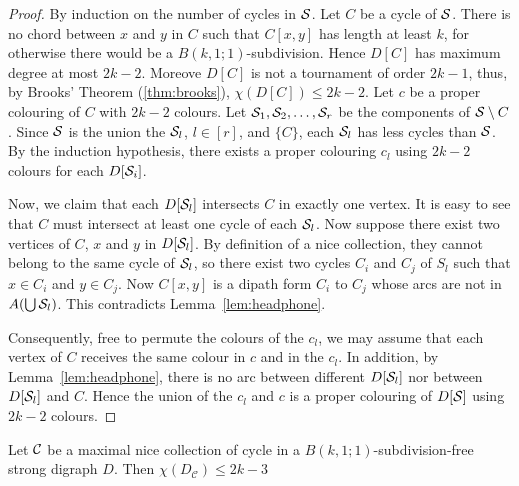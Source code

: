 \documentclass{endm}
\begin{document}
\begin{proof}
By induction on the number of cycles in ${\cal S}$. Let $C$ be a cycle of ${\cal S}$. There is no chord between $x$ and $y$ in $C$
such that $C[x,y]$ has length at least $k$, for otherwise there would be a $B(k,1;1)$-subdivision. Hence $D[C]$ has maximum degree at most $2k-2$. Moreove $D[C]$ is not a tournament of order $2k-1$,
thus, by Brooks' Theorem (\ref{thm:brooks}), $\chi(D[C])\leq 2k-2$.
 Let $c$ be a proper colouring of $C$ with $2k-2$ colours. Let ${\cal S}_1, {\cal S}_2, \dots, {\cal S}_r$ be the components of ${\cal S} \setminus{C}$. Since ${\cal S}$ is the union the ${\cal S}_l$, $l\in [r]$, and $\{C\}$,
each ${\cal S}_l$ has less cycles than ${\cal S}$. By the induction hypothesis, there exists a proper colouring $c_l$ using $2k-2$ colours for each $D[{\cal S}_i]$.
 
Now, we claim that each $D[{\cal S}_l]$ intersects $C$ in exactly one vertex. It is easy to see that $C$ must intersect at least one cycle of each ${\cal S}_l$.
Now suppose there exist two vertices of $C$, $x$ and $y$ in $D[{\cal S}_l]$. By definition of a nice collection, they cannot belong to the same cycle 
of ${\cal S}_l$, so there exist two cycles $C_i$ and $C_j$ of $S_l$ such that $x \in C_i$ and $y \in C_j$. Now $C[x,y]$ is a dipath form $C_i$ to $C_j$ whose arcs are not in $A(\bigcup {\cal S}_l)$. This contradicts Lemma~\ref{lem:headphone}. 

Consequently, free to permute the colours of the $c_l$,
we may assume that each vertex of $C$ receives the same colour in $c$ and in the $c_l$. 
In addition, by Lemma~\ref{lem:headphone}, there is no arc between different $D[{\cal S}_l]$ nor between $D[{\cal S}_l]$ and $C$. Hence the union of the 
$c_l$ and $c$ is a proper colouring of $D[{\cal S}]$ using $2k-2$ colours. 
\end{proof}


\begin{lemma}\label{lem:reduce}
Let ${\cal C}$ be a maximal nice collection of cycle in a $B(k,1;1)$-subdivision-free strong digraph $D$. Then $\chi(D_{\mathcal{C}}) \leq 2k-3$
\end{lemma}
\end{document}
